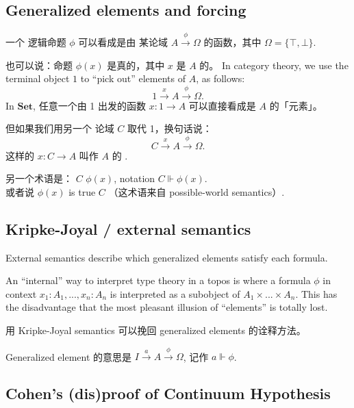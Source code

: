 \subsection{Generalized elements and forcing}

一个 逻辑命题 $\phi$ 可以看成是由 某论域 $A \stackrel{\phi}{\rightarrow} \Omega$ 的函数，其中 $\Omega = \{ \top, \bot \}$.

也可以说：命题 $\phi(x)$ 是真的，其中 $x$ 是 $A$ 的。 In category theory, we use the terminal object $1$ to ``pick out'' elements of $A$, as follows:
\begin{equation}
1 \stackrel{x}{\rightarrow} A \stackrel{\phi}{\rightarrow} \Omega.
\end{equation}
In $\mathbf{Set}$, 任意一个由 1 出发的函数 $x: 1 \rightarrow A$ 可以直接看成是 $A$ 的「元素」。

但如果我们用另一个 论域 $C$ 取代 1，换句话说：
\begin{equation}
C \stackrel{x}{\rightarrow} A \stackrel{\phi}{\rightarrow} \Omega.
\end{equation}
这样的 $x: C \rightarrow A$ 叫作 $A$ 的 .

另一个术语是： $C$  $\phi(x)$, notation $C \Vdash \phi(x)$. \\
或者说 $\phi(x)$ is true  $C$ （这术语来自 possible-world semantics）.

\subsection{Kripke-Joyal / external semantics}

External semantics describe which generalized elements satisfy each formula.

An ``internal'' way to interpret type theory in a topos is where a formula $\phi$ in context $x_1: A_1, ... , x_n: A_n$ is interpreted as a subobject of $A_1 \times ... \times A_n$.  This has the disadvantage that the most pleasant illusion of ``elements'' is totally lost.

用 Kripke-Joyal semantics 可以挽回 generalized elements 的诠释方法。 

Generalized element 的意思是 $I \stackrel{a}{\rightarrow} A \stackrel{\phi}{\rightarrow} \Omega$, 记作 $a \Vdash \phi$.

\subsection{Cohen's (dis)proof of Continuum Hypothesis}

